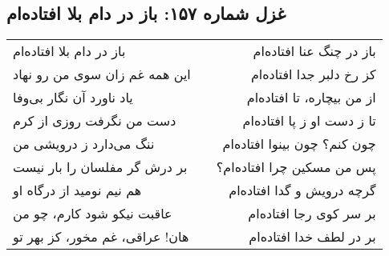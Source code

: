 \begin{center}
\section*{غزل شماره ۱۵۷: باز در دام بلا افتاده‌ام}
\label{sec:157}
\begin{longtable}{l p{0.5cm} r}
باز در دام بلا افتاده‌ام
&&
باز در چنگ عنا افتاده‌ام
\\
این همه غم زان سوی من رو نهاد
&&
کز رخ دلبر جدا افتاده‌ام
\\
یاد ناورد آن نگار بی‌وفا
&&
از من بیچاره، تا افتاده‌ام
\\
دست من نگرفت روزی از کرم
&&
تا ز دست او ز پا افتاده‌ام
\\
ننگ می‌دارد ز درویشی من
&&
چون کنم؟ چون بینوا افتاده‌ام
\\
بر درش گر مفلسان را بار نیست
&&
پس من مسکین چرا افتاده‌ام؟
\\
هم نیم نومید از درگاه او
&&
گرچه درویش و گدا افتاده‌ام
\\
عاقبت نیکو شود کارم، چو من
&&
بر سر کوی رجا افتاده‌ام
\\
هان! عراقی، غم مخور، کز بهر تو
&&
بر در لطف خدا افتاده‌ام
\\
\end{longtable}
\end{center}
